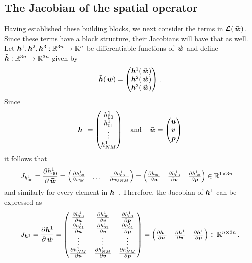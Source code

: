 \subsection{The Jacobian of the spatial operator}%
\label{sub:the_jacobian_of_the_spatial_operator}
Having established these building blocks, we next consider the terms in $\euln(\wn)$. Since these terms have a block structure, their Jacobians will have that as well. Let $\bm{h}^1,\bm{h}^2,\bm{h}^3: \mathbb{R}^{3n} \to \mathbb{R}^n$ be differentiable functions of $\wn$ and define $\tilde{\bm{h}} : \mathbb{R}^{3n}\to \mathbb{R}^{3n}$ given by
\[
   \tilde{\hn}(\wn) = 
   \begin{pmatrix}
      \hn^1(\wn) \\ \hn^2(\wn) \\ \hn^3(\wn)
   \end{pmatrix}
   \, .
\]
Since 
\[
    \hn^1  = 
    \begin{pmatrix}
        h^1_{00} \\ h^1_{01} \\ \vdots \\ h^1_{NM}
    \end{pmatrix}
    \quad 
    \text{and}
    \quad
    \wn = 
    \begin{pmatrix}
        \un \\ \vn \\ \pn
    \end{pmatrix}
\]
it follows that 
\begin{align*}
    J_{h^1_{00}} = 
    \frac{\partial h^1_{00}}{\partial \wn} 
    & =
    \begin{pmatrix}
       \frac{\partial h^1_{00}}{\partial w_{00}} 
       & 
       \dots 
       &
       \frac{\partial h^1_{00}}{\partial w_{3NM}} 
    \end{pmatrix}
    =
    \begin{pmatrix}
        \frac{\partial h^1_{00}}{\partial \un} 
        & 
        \frac{\partial h^1_{00}}{\partial \vn}
        &
        \frac{\partial h^1_{00}}{\partial \pn}
    \end{pmatrix} \in \Rbb^{1\times 3n}
\end{align*}
and similarly for every element in $\bm{h}^1$. Therefore, the Jacobian of $\bm{h}^1$ can be expressed as
\[
    J_{\hn^1} = 
    \frac{\partial \hn^1}{\partial \wn} 
    =
    \begin{pmatrix}
      \frac{\partial h^1_{00}}{\partial \un} & 
      \frac{\partial h^1_{00}}{\partial \vn} & 
      \frac{\partial h^1_{00}}{\partial \pn} 
      \\
      \frac{\partial h^1_{01}}{\partial \un} & 
      \frac{\partial h^1_{01}}{\partial \vn} & 
      \frac{\partial h^1_{01}}{\partial \pn} 
      \\
      \vdots  & \vdots & \vdots
      \\
      \frac{\partial h^1_{NM}}{\partial \un} & 
      \frac{\partial h^1_{NM}}{\partial \vn} & 
      \frac{\partial h^1_{NM}}{\partial \pn} 
    \end{pmatrix}
    = 
    \begin{pmatrix}
      \frac{\partial \hn^1}{\partial \un} & 
      \frac{\partial \hn^1}{\partial \vn} & 
      \frac{\partial \hn^1}{\partial \pn} 
    \end{pmatrix}
    \in \Rbb^{n\times 3n}
    \, .
\]
